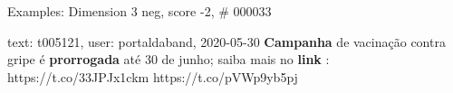 \begin{frame}{Examples: Dimension 3 neg, score -2, \# 000033}
\footnotesize
\begin{alertblock}{text: t005121, user: portaldaband, 2020-05-30}
\textbf{Campanha} de vacinação contra gripe é \textbf{prorrogada} até 30 de 
junho; saiba mais no \textbf{link} : https://t.co/33JPJx1ckm 
https://t.co/pVWp9yb5pj 
\end{alertblock}
\end{frame}
